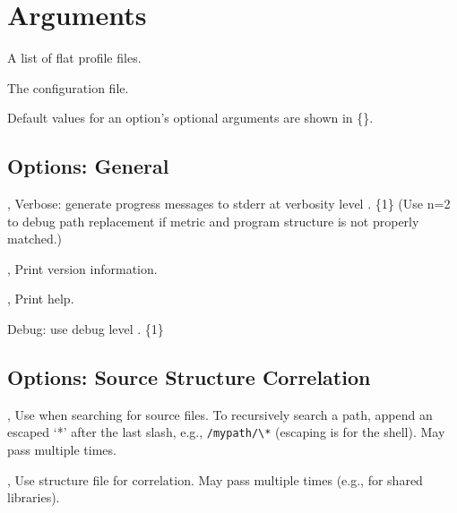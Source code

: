 \documentclass[english]{article}
\begin{document}
\section{Arguments}

\begin{Description}
\item[\Arg{profile-file...}] A list of flat profile files.
\item[\Arg{config-file}] The  configuration file.
\end{Description}

Default values for an option's optional arguments are shown in \{\}.

\subsection{Options: General}

\begin{Description}
\item[\OptoArg{-v}{n}, \OptoArg{--verbose}{n}] Verbose: generate progress messages to stderr at verbosity level .  \{1\}  (Use n=2 to debug path replacement if metric and program structure is not properly matched.)
\item[\Opt{-V}, \Opt{--version}] Print version information.
\item[\Opt{-h}, \Opt{--help}] Print help.
\item[\OptoArg{--debug}{n}]   Debug: use debug level . \{1\}
\end{Description}

\subsection{Options: Source Structure Correlation}

\begin{Description}
\item[\OptArg{-I}{path}, \OptArg{--include}{path}] Use  when searching for source files. To recursively search a path, append an escaped `*' after the last slash, e.g., \verb+/mypath/\*+ (escaping is for the shell). May pass multiple times.
\item[\OptArg{-S}{file}, \OptArg{--structure}{file}] Use  structure file  for correlation.  May pass multiple times (e.g., for shared libraries).
\end{Description}
\end{document}
